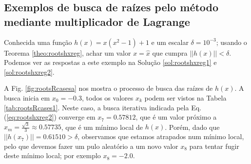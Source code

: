 \subsection{Exemplos de busca de raízes pelo método mediante multiplicador de Lagrange}


\begin{example}\label{ex:rootshxreg1}
Conhecida uma função $h(x)=x(x^2-1)+1$ e um escalar $\delta=10^{-3}$; usando o Teorema \ref{theo:rootshxreg},
achar um valor $x=\hat{x}$ que cumpra $||h(x)||<\delta$.
Podemos ver as respostas a este exemplo na Solução \ref{sol:rootshxreg1} e \ref{sol:rootshxreg2}.
\end{example}
\begin{SolutionT}\label{sol:rootshxreg1}
 A Fig. \ref{fig:rootsRcasesa} nos mostra o processo de busca das raízes de $h(x)$. 
A busca inicia em $x_0=-0.3$, 
todos os valores $x_{k}$ podem ser vistos na
Tabela \ref{tab:rootsRcases1}. 
Neste caso, a busca iterativa indicada pela Eq. (\ref{eq:rootshxreg2}) 
converge em $x_7=0.57812$, que é um valor próximo a $x_m=\frac{\sqrt{3}}{3}\approx 0.57735$,
que é um mínimo local de $h(x)$.
Porém, dado que $||h(x_7)||=0.61510 >\delta$, observamos que estamos atrapados num mínimo local,
pelo que devemos fazer um pulo aleatório a um novo valor $x_8$
para tentar fugir deste mínimo local; por exemplo $x_8=-2.0$.
\end{SolutionT}

